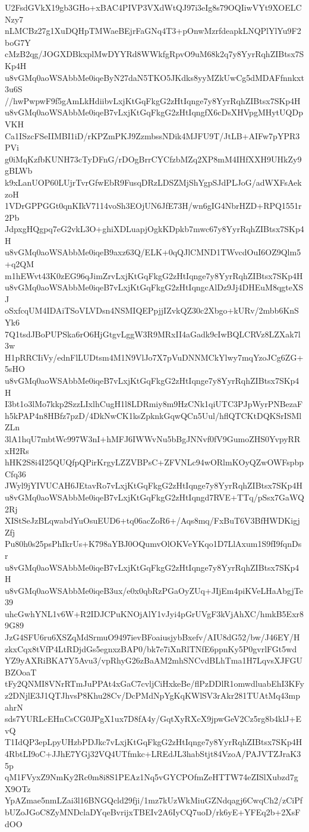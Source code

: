 U2FsdGVkX19gb3GHo+xBAC4PIVP3VXdWtQJ97i3eIg8s79OQIiwVYt9XOELCNzy7
nLMCBz27g1XuDQHpTMWaeBEjrFaGNq4T3+pOnwMzrfdeapkLNQPlYlYu9F2boG7Y
cMzB2qg/JOGXDBkxplMwDYYRd8WWkfgRpvO9uM68k2q7y8YyrRqhZIBtsx7SKp4H
u8vGMq0aoWSAbbMe0iqeByN27daN5TKO5JKdks8yyMZkUwCg5dMDAFfnnkxt3u6S
//hwPwpwF9f5gAmLkHdiibvLxjKtGqFkgG2zHtIqnge7y8YyrRqhZIBtsx7SKp4H
u8vGMq0aoWSAbbMe0iqeB7vLxjKtGqFkgG2zHtIqngfX6cDsXHVpgMHytUQDpVKH
Ca1ISzcFSeIIMBI1iD/rKPZmPKJ9ZzmbssNDik4MJFU9T/JtLB+AIFw7pYPR3PVi
g0iMqKzfbKUNH73cTyDFnG/rDOgBrrCYCfzbMZq2XP8mM4IHfXXH9UHkZy9gBLWb
k9xLanUOP60LUjrTvrGfwEbR9FusqDRzLDSZMjShYgpSJdPLJoG/adWXFsAekzoH
1VDrGPPGGt0qnKIkV7114voSh3EOjUN6JfE73H/wn6gIG4NbrHZD+RPQ1551r2Pb
JdpxgHQgpq7eG2vkL3O+ghiXDLuapjOgkKDpkb7mwc67y8YyrRqhZIBtsx7SKp4H
u8vGMq0aoWSAbbMe0iqeB9axz63Q/ELK+0qQJlCMND1TWvcdOuI6OZ9Qlm5+q2QM
m1hEWvt43K0zEG96qJimZrvLxjKtGqFkgG2zHtIqnge7y8YyrRqhZIBtsx7SKp4H
u8vGMq0aoWSAbbMe0iqeB7vLxjKtGqFkgG2zHtIqngcAlDz9Jj4DHEuM8qgteXSJ
oSxfcqUM4IDAiTSoVLVDsn4NSMIQEPpjjIZvkQZ30c2Xbgo+kURv/2mbb6KnSYk6
7Q1tsdJBoPUPSka6rO6HjGtgvLggW3R9MRxII4aGadk9cIwBQLCRVz8LZXak7l3w
H1pRRCIiVy/ednFlLUDtsm4M1N9VlJo7X7pVuDNNMCkYlwy7mqYzoJCg6ZG+5sHO
u8vGMq0aoWSAbbMe0iqeB7vLxjKtGqFkgG2zHtIqnge7y8YyrRqhZIBtsx7SKp4H
I3bt1o3lMo7kkp2SzzLIxlhCugH1l8LDRmiy8m9HzCNk1qiUTC3PJpWyrPNBezaF
h5kPAP4n8HBfz7pzD/4DkNwCK1ksZpknkGqwQCn5Uul/hflQTCKtDQKSrISMlZLn
3lA1hqU7mbtWc997W3nI+hMFJ6IWWvNu5bBgJNNvf0fV9GumoZHS0YvpyRRxH2Rs
hHK2S8i4I25QUQfpQPirKrgyLZZVBPsC+ZFVNLc94wORlmKOyQZwOWFspbpCfq36
JWyl9jYIVUCAH6JEtavRo7vLxjKtGqFkgG2zHtIqnge7y8YyrRqhZIBtsx7SKp4H
u8vGMq0aoWSAbbMe0iqeB7vLxjKtGqFkgG2zHtIqngd7RVE+TTq/pSsx7GaWQ2Rj
XIStSeJzBLqwabdYuOsuEUD6+tq06acZoR6+/Aqs8mq/FxBuT6V3BfHWDKigjZfj
Pu80h0s25psPhIkrUs+K798aYBJ0OQumvOlOKVeYKqo1D7LlAxum1S9fI9fqnDsr
u8vGMq0aoWSAbbMe0iqeB7vLxjKtGqFkgG2zHtIqnge7y8YyrRqhZIBtsx7SKp4H
u8vGMq0aoWSAbbMe0iqeB3ux/e0x0qbRzPGaOyZUq+JIjEm4piKVeLHaAbgjTe39
uhcGwhYNL1v6W+R2IDJCPuKNOjAlY1vJyi4pGrUVgF3kVjAhXC/hmkB5Exr89G89
JzG4SFU6ru6XSZqMdSrmuO9497ievBFoaiusjybBxefv/AIU8dG52/bw/J46EY/H
zkxCqx8tVfP4LtRDjdGs5egnxzBAP0/bk7e7iXnRlTNfE6ppnKy5P0gvrlFGt5wd
YZ9yAXRiBKA7Y5Avu3/vpRhyG26zBaAM2mhSNCvdBLhTma1H7LqvsXJFGUBZOoaT
tFy2QNMI8VNrRTmJuPPAt4xGaC7cvljCiHxkeBe/flPzDDlR1omwdluabEhI3KFy
z2DNjlE3J1QTJhvsP8Khu28Cv/DcPMdNpYgKqKWlSV3rAkr281TUAtMq43mpahrN
sds7YURLcEHnCsCG0JPgX1ux7D8fA4y/GqtXyRXcX9jpwGeV2Cz5rg8b4klJ+EvQ
T1IdQP3epLpyUHzbPDJkc7vLxjKtGqFkgG2zHtIqnge7y8YyrRqhZIBtsx7SKp4H
4RbtLI9oC+JJhE7YGj32VQ4UTfmkc+LREdJL3habStjt84VzoA/PAJVTZJraK35p
qM1FVyxZ9NmKy2Rc0m8i8S1PEAz1Nq5vGYCPOfmZeHTTW74eZISlXubzd7gX9OTz
YpAZmae5nmLZai3l16BNGQcld29fji/1mz7kUzWkMiuGZNdqagj6CwqCh2/zCiPf
bUZoJGoC8ZyMNDclaDYqeBvrijxTBEIv2A6IyCQ7uoD/rk6yE+YFEq2b+2XsFdOO
